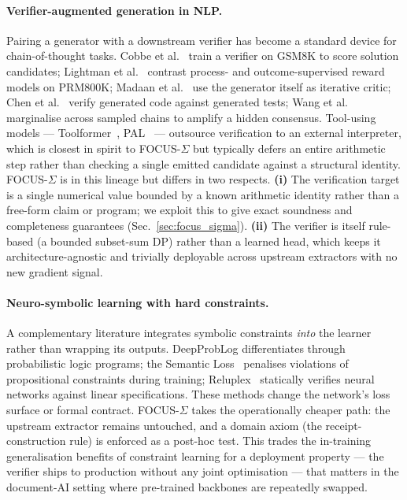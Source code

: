 \paragraph{Verifier-augmented generation in NLP.}
Pairing a generator with a downstream verifier has become a standard
device for chain-of-thought tasks.  Cobbe et al.~\cite{cobbe2021training}
train a verifier on GSM8K to score solution candidates;
Lightman et al.~\cite{lightman2023verify} contrast process- and
outcome-supervised reward models on PRM800K;
Madaan et al.~\cite{madaan2023selfrefine} use the generator itself as
iterative critic; Chen et al.~\cite{chen2022codet} verify generated
code against generated tests; Wang et al.~\cite{wang2023selfconsistency}
marginalise across sampled chains to amplify a hidden consensus.
Tool-using models — Toolformer~\cite{schick2023toolformer},
PAL~\cite{gao2023pal} — outsource verification to an external
interpreter, which is closest in spirit to FOCUS-$\Sigma$ but
typically defers an entire arithmetic step rather than checking a
single emitted candidate against a structural identity.
FOCUS-$\Sigma$ is in this lineage but differs in two respects.
\textbf{(i)} The verification target is a single numerical value
bounded by a known arithmetic identity rather than a free-form claim
or program; we exploit this to give exact soundness and completeness
guarantees (Sec.~\ref{sec:focus_sigma}).
\textbf{(ii)} The verifier is itself rule-based (a bounded subset-sum
DP) rather than a learned head, which keeps it
architecture-agnostic and trivially deployable across upstream
extractors with no new gradient signal.

\paragraph{Neuro-symbolic learning with hard constraints.}
A complementary literature integrates symbolic constraints \emph{into}
the learner rather than wrapping its outputs.  DeepProbLog
\cite{manhaeve2018deepproblog} differentiates through probabilistic
logic programs; the Semantic Loss~\cite{xu2018semanticloss} penalises
violations of propositional constraints during training;
Reluplex~\cite{katz2017reluplex} statically verifies neural networks
against linear specifications.  These methods change the network's
loss surface or formal contract.  FOCUS-$\Sigma$ takes the
operationally cheaper path: the upstream extractor remains untouched,
and a domain axiom (the receipt-construction rule) is enforced as a
post-hoc test.  This trades the in-training generalisation benefits
of constraint learning for a deployment property — the verifier
ships to production without any joint optimisation — that matters in
the document-AI setting where pre-trained backbones are repeatedly
swapped.

